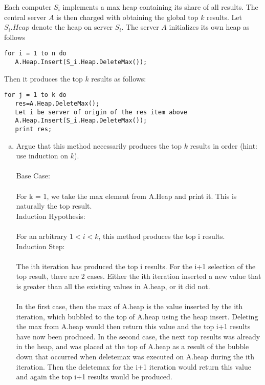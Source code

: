 \documentclass[12pt]{article}
\begin{document}
Each computer $S_i$ implements a max heap containing its share of all results. The
central server $A$ is then charged with obtaining the global top $k$ results. Let $S_i.Heap$ denote the heap on server
$S_i$. The server $A$ initializes its own heap as follows

\begin{verbatim}
for i = 1 to n do
   A.Heap.Insert(S_i.Heap.DeleteMax());
\end{verbatim}
Then it produces the top $k$ results as follows:

\begin{verbatim}
for j = 1 to k do
   res=A.Heap.DeleteMax();
   Let i be server of origin of the res item above
   A.Heap.Insert(S_i.Heap.DeleteMax());
   print res;
\end{verbatim}
\begin{enumerate}[(a)]
\item Argue that this method necessarily produces the top $k$ results in order
(hint: use induction on $k$).\\\\

Base Case:\\\\
For k = 1, we take the max element from A.Heap and print it. This is naturally the top result.\\
Induction Hypothesis:\\\\
For an arbitrary $1 < i < k$, this method produces the top i results.\\
Induction Step:\\\\
The ith iteration has produced the top i results. For the i+1 selection of the top result, there are 2 cases. Either the ith iteration inserted a new value that is greater than all the existing values in A.heap, or it did not. \\\\In the first case, then the max of A.heap is the value inserted by the ith iteration, which bubbled to the top of A.heap using the heap insert. Deleting the max from A.heap would then return this value and the top i+1 results have now been produced. In the second case, the next top results was already in the heap, and was placed at the top of A.heap as a result of the bubble down that occurred when deletemax was executed on A.heap during the ith iteration. Then the deletemax for the i+1 iteration would return this value and again the top i+1 results would be produced.\\


\end{enumerate}
\end{document}

